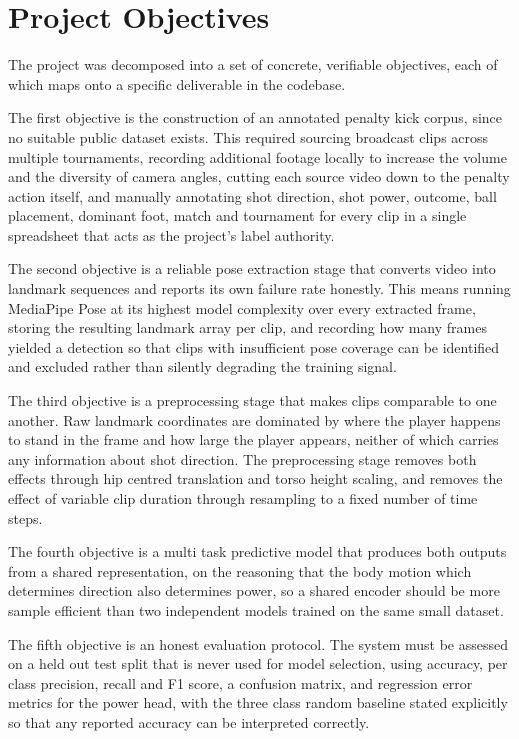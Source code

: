 \section{Project Objectives}

The project was decomposed into a set of concrete, verifiable objectives, each of which maps onto a specific deliverable in the codebase.

The first objective is the construction of an annotated penalty kick corpus, since no suitable public dataset exists. This required sourcing broadcast clips across multiple tournaments, recording additional footage locally to increase the volume and the diversity of camera angles, cutting each source video down to the penalty action itself, and manually annotating shot direction, shot power, outcome, ball placement, dominant foot, match and tournament for every clip in a single spreadsheet that acts as the project's label authority.

The second objective is a reliable pose extraction stage that converts video into landmark sequences and reports its own failure rate honestly. This means running MediaPipe Pose at its highest model complexity over every extracted frame, storing the resulting landmark array per clip, and recording how many frames yielded a detection so that clips with insufficient pose coverage can be identified and excluded rather than silently degrading the training signal.

The third objective is a preprocessing stage that makes clips comparable to one another. Raw landmark coordinates are dominated by where the player happens to stand in the frame and how large the player appears, neither of which carries any information about shot direction. The preprocessing stage removes both effects through hip centred translation and torso height scaling, and removes the effect of variable clip duration through resampling to a fixed number of time steps.

The fourth objective is a multi task predictive model that produces both outputs from a shared representation, on the reasoning that the body motion which determines direction also determines power, so a shared encoder should be more sample efficient than two independent models trained on the same small dataset.

The fifth objective is an honest evaluation protocol. The system must be assessed on a held out test split that is never used for model selection, using accuracy, per class precision, recall and F1 score, a confusion matrix, and regression error metrics for the power head, with the three class random baseline stated explicitly so that any reported accuracy can be interpreted correctly.

